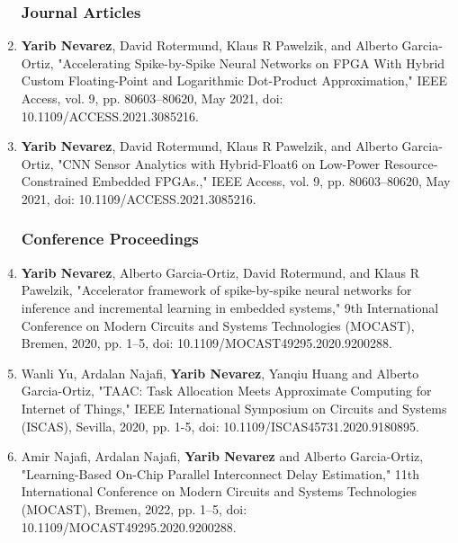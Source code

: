 \begin{enumerate}
	
	\subsubsection*{Journal Articles}
	
	\item \textbf{Yarib Nevarez}, David Rotermund, Klaus R Pawelzik, and Alberto Garcia-Ortiz, "Accelerating Spike-by-Spike Neural Networks on FPGA With Hybrid Custom Floating-Point and Logarithmic Dot-Product Approximation," 
	\newblock IEEE Access, vol. 9, pp. 80603--80620, May 2021, doi: 10.1109/ACCESS.2021.3085216.  
	
	\item \textbf{Yarib Nevarez}, David Rotermund, Klaus R Pawelzik, and Alberto Garcia-Ortiz, "CNN Sensor Analytics with Hybrid-Float6
	on Low-Power Resource-Constrained
	Embedded FPGAs.," 
	\newblock IEEE Access, vol. 9, pp. 80603--80620, May 2021, doi: 10.1109/ACCESS.2021.3085216.

	
	\subsubsection*{Conference Proceedings}
	
	\item \textbf{Yarib Nevarez}, Alberto Garcia-Ortiz, David Rotermund, and Klaus R Pawelzik, "Accelerator framework of spike-by-spike neural networks for inference and incremental learning in embedded systems,"
	 9th International Conference on Modern Circuits and Systems Technologies (MOCAST), Bremen, 2020, pp. 1--5, doi: 10.1109/MOCAST49295.2020.9200288.
	
	\item Wanli Yu, Ardalan Najafi, \textbf{Yarib Nevarez}, Yanqiu Huang and Alberto Garcia-Ortiz, "TAAC: Task Allocation Meets Approximate Computing for Internet of Things," 
	 IEEE International Symposium on Circuits and Systems (ISCAS), Sevilla, 2020, pp. 1-5, doi: 10.1109/ISCAS45731.2020.9180895.
	
	\item Amir Najafi, Ardalan Najafi, \textbf{Yarib Nevarez} and Alberto Garcia-Ortiz, "Learning-Based On-Chip Parallel Interconnect Delay Estimation," 
	 11th International Conference on Modern Circuits and Systems Technologies (MOCAST), Bremen, 2022, pp. 1--5, doi: 10.1109/MOCAST49295.2020.9200288.
	
\end{enumerate}

